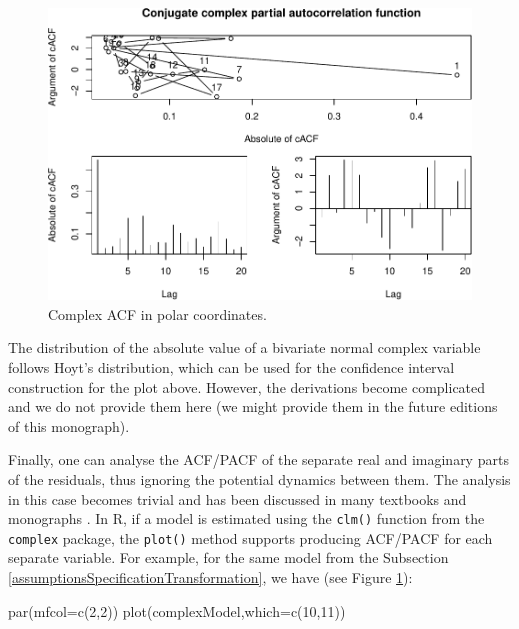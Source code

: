 \documentclass[
]{book}
\newenvironment{Shaded}{\begin{snugshade}}{\end{snugshade}}
\newcommand{\AttributeTok}[1]{\textcolor[rgb]{0.77,0.63,0.00}{#1}}
\newcommand{\DecValTok}[1]{\textcolor[rgb]{0.00,0.00,0.81}{#1}}
\newcommand{\FunctionTok}[1]{\textcolor[rgb]{0.00,0.00,0.00}{#1}}
\newcommand{\NormalTok}[1]{#1}
\begin{document}
\begin{figure}
\centering
\includegraphics{Svetunkov---Svetunkov---Complex-Valued-Econometrics_files/figure-latex/complexAR1Ploar-1.pdf}
\caption{\label{fig:complexAR1Ploar}Complex ACF in polar coordinates.}
\end{figure}

The distribution of the absolute value of a bivariate normal complex variable follows Hoyt's distribution, which can be used for the confidence interval construction for the plot above. However, the derivations become complicated and we do not provide them here (we might provide them in the future editions of this monograph).

Finally, one can analyse the ACF/PACF of the separate real and imaginary parts of the residuals, thus ignoring the potential dynamics between them. The analysis in this case becomes trivial and has been discussed in many textbooks and monographs \citep[for example, see][]{SvetunkovAdam}. In R, if a model is estimated using the \texttt{clm()} function from the \texttt{complex} package, the \texttt{plot()} method supports producing ACF/PACF for each separate variable. For example, for the same model from the Subsection \ref{assumptionsSpecificationTransformation}, we have (see Figure \ref{fig:complexAR1Ploar}):

\begin{Shaded}
\begin{Highlighting}[]
\FunctionTok{par}\NormalTok{(}\AttributeTok{mfcol=}\FunctionTok{c}\NormalTok{(}\DecValTok{2}\NormalTok{,}\DecValTok{2}\NormalTok{))}
\FunctionTok{plot}\NormalTok{(complexModel,}\AttributeTok{which=}\FunctionTok{c}\NormalTok{(}\DecValTok{10}\NormalTok{,}\DecValTok{11}\NormalTok{))}
\end{Highlighting}
\end{Shaded}
\end{document}
